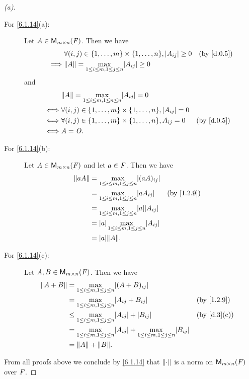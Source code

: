 \begin{proof}[(a)]
	\begin{description}
		\item[For \cref{6.1.14}(a):]
			Let \(A \in \ms\).
			Then we have
			\begin{align*}
				         & \forall (i, j) \in \set{1, \dots, m} \times \set{1, \dots, n}, \abs{A_{i j}} \geq 0 &  & \by{d.0.5} \\
				\implies & \norm{A} = \max_{1 \leq i \leq m, 1 \leq j \leq n} \abs{A_{i j}} \geq 0
			\end{align*}
			and
			\begin{align*}
				     & \norm{A} = \max_{1 \leq i \leq m, 1 \leq n \leq n} \abs{A_{i j}} = 0                             \\
				\iff & \forall (i, j) \in \set{1, \dots, m} \times \set{1, \dots, n}, \abs{A_{i j}} = 0                 \\
				\iff & \forall (i, j) \in \set{1, \dots, m} \times \set{1, \dots, n}, A_{i j} = 0       &  & \by{d.0.5} \\
				\iff & A = \zm.
			\end{align*}
		\item[For \cref{6.1.14}(b):]
			Let \(A \in \ms\) and let \(a \in \mathit{F}\).
			Then we have
			\begin{align*}
				\norm{a A} & = \max_{1 \leq i \leq m, 1 \leq j \leq n} \abs{(a A)_{i j}}                     \\
				           & = \max_{1 \leq i \leq m, 1 \leq j \leq n} \abs{a A_{i j}}       &  & \by{1.2.9} \\
				           & = \max_{1 \leq i \leq m, 1 \leq j \leq n} \abs{a} \abs{A_{i j}}                 \\
				           & = \abs{a} \max_{1 \leq i \leq m, 1 \leq j \leq n} \abs{A_{i j}}                 \\
				           & = \abs{a} \norm{A}.
			\end{align*}
		\item[For \cref{6.1.14}(c):]
			Let \(A, B \in \ms\).
			Then we have
			\begin{align*}
				\norm{A + B} & = \max_{1 \leq i \leq m, 1 \leq j \leq n} \abs{(A + B)_{i j}}                                                                    \\
				             & = \max_{1 \leq i \leq m, 1 \leq j \leq n} \abs{A_{i j} + B_{i j}}                                               &  & \by{1.2.9}  \\
				             & \leq \max_{1 \leq i \leq m, 1 \leq j \leq n} \abs{A_{i j}} + \abs{B_{i j}}                                      &  & \by{d.3}[c] \\
				             & = \max_{1 \leq i \leq m, 1 \leq j \leq n} \abs{A_{i j}} + \max_{1 \leq i \leq m, 1 \leq j \leq n} \abs{B_{i j}}                  \\
				             & = \norm{A} + \norm{B}.
			\end{align*}
	\end{description}
	From all proofs above we conclude by \cref{6.1.14} that \(\left\lVert\cdot\right\rVert\) is a norm on \(\ms\) over \(\mathit{F}\).
\end{proof}

